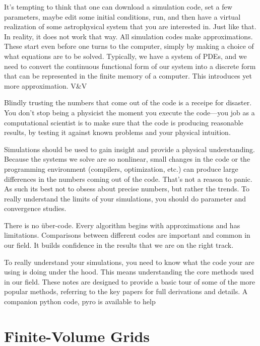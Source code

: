 \documentclass[11pt]{book}
\begin{document}
It's tempting to think that one can download a simulation code, set a
few parameters, maybe edit some initial conditions, run, and then have
a virtual realization of some astrophysical system that you are
interested in.  Just like that.  In reality, it does not work that
way.  All simulation codes make approximations.  These start even
before one turns to the computer, simply by making a choice of what
equations are to be solved.  Typically, we have a system of PDEs,
and we need to convert the continuous functional form of our system
into a discrete form that can be represented in the finite memory of 
a computer.  This introduces yet more approximation.  V\&V

Blindly trusting the numbers that come out of the code is a receipe
for disaster.  You don't stop being a physicist the moment you execute
the code---you job as a computational scientist is to make sure that
the code is producing reasonable results, by testing it against known
problems and your physical intuition.  

Simulations should be used to gain insight and provide a physical
understanding.  
Because the systems we solve are so nonlinear, small changes in the
code or the programming environment (compilers, optimization, etc.)
can produce large differences in the numbers coming out of the code.
That's not a reason to panic.
As such its best not to obsess about precise numbers, but rather the
trends.  To really understand the limits of your simulations, you
should do parameter and convergence studies.

There is no \"uber-code.  Every algorithm begins with approximations
and has limitations.  Comparisons between different codes are
important and common in our field.  It builds confidence in the
results that we are on the right track.

To really understand your simulations, you need to know what the code
your are using is doing under the hood.  This means understanding the 
core methods used in our field.  These notes are designed to provide
a basic tour of some of the more popular methods, referring to the 
key papers for full derivations and details.  A companion python code,
{\sf pyro} is available to help 




\chapter{Finite-Volume Grids}


\end{document}
